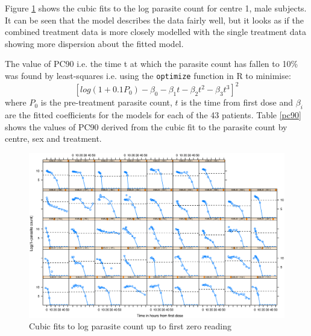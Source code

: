 Figure \ref{cubics} shows the cubic fits to the log parasite count for centre 1, male subjects. It can be seen that the model describes the data fairly well, but it looks as if the combined treatment data is more closely modelled with the single treatment data showing more dispersion about the fitted model. 

The value of PC90 i.e. the time t at which the parasite count has fallen to 10\% was found by least-squares i.e. using the \texttt{optimize} function in R to minimise:
$$[log(1+0.1P_0)-\beta_0-\beta_1t-\beta_2t^2-\beta_3t^3]^2$$
where $P_0$ is the pre-treatment parasite count, $t$ is the time from first dose and $\beta_i$ are the fitted coefficients for the models for each of the 43 patients. Table \ref{pc90} shows the values of PC90 derived from the cubic fit to the parasite count by centre, sex and treatment.
\begin{figure}[p]
\includegraphics[width=6.1in]{cubics.eps} 
\caption{Cubic fits to log parasite count up to first zero reading}\label{cubics}
\end{figure}
